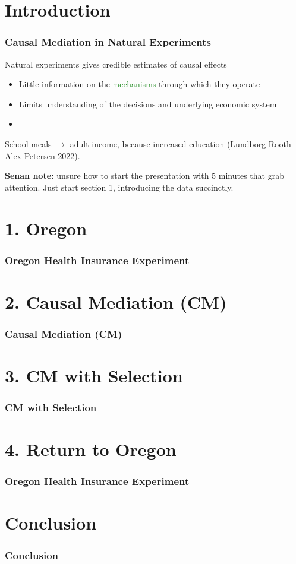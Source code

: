\documentclass[dvipsnames,handout]{beamer} %
\begin{document}
\section{Introduction}
\begin{frame}
    \frametitle{Causal Mediation in Natural Experiments}
    Natural experiments gives credible estimates of causal effects
    \begin{itemize}
        \item Little information on the \textcolor{ForestGreen}{mechanisms} through which they operate
        \item Limits understanding of the decisions and underlying economic system
        \item  
    \end{itemize}

    School meals $\to$ adult income, because increased education 
    (Lundborg Rooth Alex-Petersen 2022).

    \textbf{Senan note:} unsure how to start the presentation with 5 minutes that grab attention.
    Just start section 1, introducing the data succinctly.
\end{frame}
\section{1. Oregon}
\begin{frame}
    \frametitle{Oregon Health Insurance Experiment}
\end{frame}
\section{2. Causal Mediation (CM)}
\begin{frame}
    \frametitle{Causal Mediation (CM)}
\end{frame}
\section{3. CM with Selection}
\begin{frame}
    \frametitle{CM with Selection}
\end{frame}
\section{4. Return to Oregon}
\begin{frame}
    \frametitle{Oregon Health Insurance Experiment}
\end{frame}
\section{Conclusion}
\begin{frame}
    \frametitle{Conclusion}
\end{frame}
\end{document}
